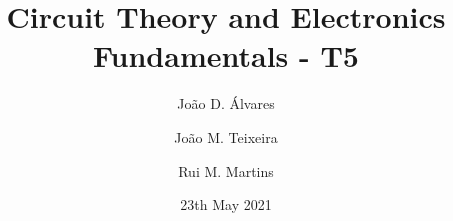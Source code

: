 \title{\textbf{Circuit Theory and Electronics Fundamentals - T5}}
\author[1]{João D. Álvares}
\author[1]{João M. Teixeira}
\author[1]{Rui M. Martins}


\date{23th May 2021}